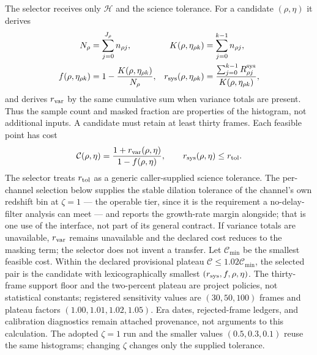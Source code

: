 The selector receives only $\mathcal H$ and the science tolerance. For a candidate $(\rho,\eta)$ it derives
\begin{align}
N_\rho &= \sum_{j=0}^{J_\rho} n_{\rho j}, &
K(\rho,\eta_{\rho k}) &= \sum_{j=0}^{k-1}n_{\rho j},\\
f(\rho,\eta_{\rho k}) &= 1-\frac{K(\rho,\eta_{\rho k})}{N_\rho}, &
r_{\rm sys}(\rho,\eta_{\rho k}) &=
\frac{\sum_{j=0}^{k-1}R^{\rm sys}_{\rho j}}
{K(\rho,\eta_{\rho k})},
\end{align}
and derives $r_{\rm var}$ by the same cumulative sum when variance totals are present. Thus the sample count and masked fraction are properties of the histogram, not additional inputs. A candidate must retain at least thirty frames. Each feasible point has cost
\[
\mathcal C(\rho,\eta)=\frac{1 + r_{\rm var}(\rho,\eta)}{1 - f(\rho,\eta)},
\qquad r_{\rm sys}(\rho,\eta) \le r_{\rm tol}.
\]
The selector treats $r_{\rm tol}$ as a generic caller-supplied science tolerance. The per-channel selection below supplies the stable dilation tolerance of the channel's own redshift bin at $\zeta=1$ --- the operable tier, since it is the requirement a no-delay-filter analysis can meet --- and reports the growth-rate margin alongside; that is one use of the interface, not part of its general contract. If variance totals are unavailable, $r_{\rm var}$ remains unavailable and the declared cost reduces to the masking term; the selector does not invent a transfer. Let $\mathcal C_{\min}$ be the smallest feasible cost. Within the declared provisional plateau $\mathcal C\le1.02\mathcal C_{\min}$, the selected pair is the candidate with lexicographically smallest $(r_{\rm sys},f,\rho,\eta)$. The thirty-frame support floor and the two-percent plateau are project policies, not statistical constants; registered sensitivity values are $(30,50,100)$ frames and plateau factors $(1.00,1.01,1.02,1.05)$. Era dates, rejected-frame ledgers, and calibration diagnostics remain attached provenance, not arguments to this calculation. The adopted $\zeta=1$ run and the smaller values $(0.5,0.3,0.1)$ reuse the same histograms; changing $\zeta$ changes only the supplied tolerance.

